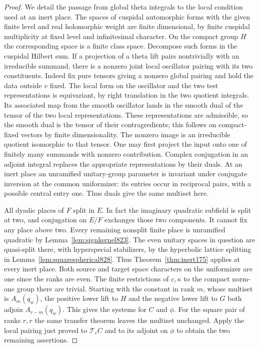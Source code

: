 \documentclass[a4paper,11pt]{article}
\theoremstyle{definition}
\theoremstyle{remark}
\numberwithin{equation}{section}
\begin{document}
\begin{proof}
We detail the passage from global theta integrals to the
local condition used at an inert place. The spaces of
cuspidal automorphic forms with the given finite level and
real holomorphic weight are finite dimensional, by finite
cuspidal multiplicity at fixed level and infinitesimal
character. On the compact group \(H\) the corresponding
space is a finite class space. Decompose such forms in the
cuspidal Hilbert sum. If a projection of a theta lift pairs
nontrivially with an irreducible summand, there is a
nonzero joint local oscillator pairing with its two
constituents. Indeed fix pure tensors giving a nonzero
global pairing and hold the data outside \(v\) fixed.
The local form on the oscillator and the two test
representations is equivariant, by right translation in the
two quotient integrals. Its associated map from the smooth
oscillator lands in the smooth dual of the tensor of the
two local representations. These representations are
admissible, so the smooth dual is the tensor of their
contragredients; this follows on compact-fixed vectors by
finite dimensionality. The nonzero image is an irreducible
quotient isomorphic to that tensor. One may first project
the input onto one of finitely many summands with nonzero
contribution. Complex conjugation in an adjoint integral
replaces the appropriate representations by their duals.
At an inert place an unramified unitary-group parameter is
invariant under conjugate inversion at the common uniformizer:
its entries occur in reciprocal pairs, with a possible
central entry one. Thus duals give the same multiset here.

All dyadic places of \(F\) split in \(E\). In fact the
imaginary quadratic subfield is split at two, and conjugation
on \(E/F\) exchanges those two components. It cannot fix any
place above two. Every remaining nonsplit finite place is
unramified quadratic by Lemma~\ref{lem:signkernel823}. The
even unitary spaces in question are quasi-split there, with
hyperspecial stabilizers, by the hyperbolic lattice splitting
in Lemma~\ref{lem:squarespherical828}. Thus
Theorem~\ref{thm:inert175} applies at every inert place.
Both source and target space characters on the uniformizer
are one since the ranks are even. The finite restrictions
of \(c,\kappa\) to the compact norm-one group there are
trivial. Starting with the constant in rank \(m\), whose
multiset is \(A_m(q_w)\), the positive lower lift to \(H\)
and the negative lower lift to \(G\) both adjoin \(A_{r-m}(q_w)\).
This gives the systems for \(C\) and \(\phi\). For the square
pair of ranks \(r,r\) the same transfer theorem leaves the
multiset unchanged. Apply the local pairing just proved to
\(\mathcal T_c C\) and to its adjoint on \(\phi\) to obtain the
two remaining assertions.
\end{proof}
\end{document}
